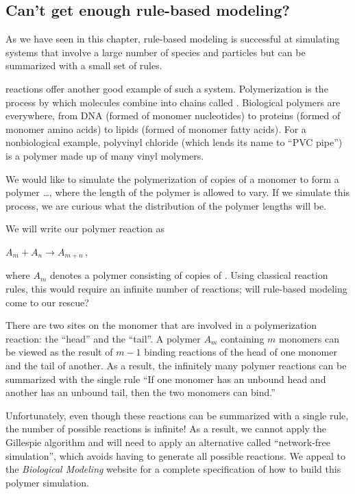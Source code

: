 \subsection{Can't get enough rule-based modeling?}

As we have seen in this chapter, rule-based modeling is successful at simulating systems that involve a large number of species and particles but can be summarized with a small set of rules.

 reactions offer another good example of such a system. Polymerization is the process by which  molecules combine into chains called . Biological polymers are everywhere, from DNA (formed of monomer nucleotides) to proteins (formed of monomer amino acids) to lipids (formed of monomer fatty acids). For a nonbiological example, polyvinyl chloride (which lends its name to ``PVC pipe'') is a polymer made up of many vinyl molymers.

We would like to simulate the polymerization of copies of a monomer  to form a polymer \ldots, where the length of the polymer is allowed to vary. If we simulate this process, we are curious what the distribution of the polymer lengths will be.

We will write our polymer reaction as

\begin{center}
$A_m + A_n \rightarrow A_{m+n}$\,,
\end{center}

\noindent where $A_m$ denotes a polymer consisting of  copies of . Using classical reaction rules, this would require an infinite number of reactions; will rule-based modeling come to our rescue?

There are two sites on the monomer  that are involved in a polymerization reaction: the ``head'' and the ``tail''. A polymer $A_m$ containing $m$ monomers can be viewed as the result of $m-1$ binding reactions of the head of one monomer and the tail of another. As a result, the infinitely many polymer reactions can be summarized with the single rule ``If one monomer has an unbound head and another has an unbound tail, then the two monomers can bind.''

Unfortunately, even though these reactions can be summarized with a single rule, the number of possible reactions is infinite! As a result, we cannot apply the Gillespie algorithm and will need to apply an alternative called ``network-free simulation'', which avoids having to generate all possible reactions. We appeal to the \textit{Biological Modeling} website for a complete specification of how to build this polymer simulation.\\

